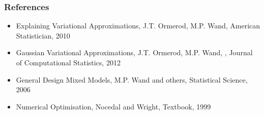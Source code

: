 \documentclass{beamer}
\begin{document}
	\begin{frame}
		\frametitle{References}
		\begin{itemize}
			\item Explaining Variational Approximations, J.T. Ormerod, M.P. Wand, American Statistician, 2010
			\item Gaussian Variational Approximations, J.T. Ormerod, M.P. Wand, , Journal of Computational Statistics, 2012
			\item General Design Mixed Models, M.P. Wand and others, Statistical Science, 2006
			\item Numerical Optimisation, Nocedal and Wright, Textbook, 1999
		\end{itemize}
	\end{frame}
		
\end{document}
